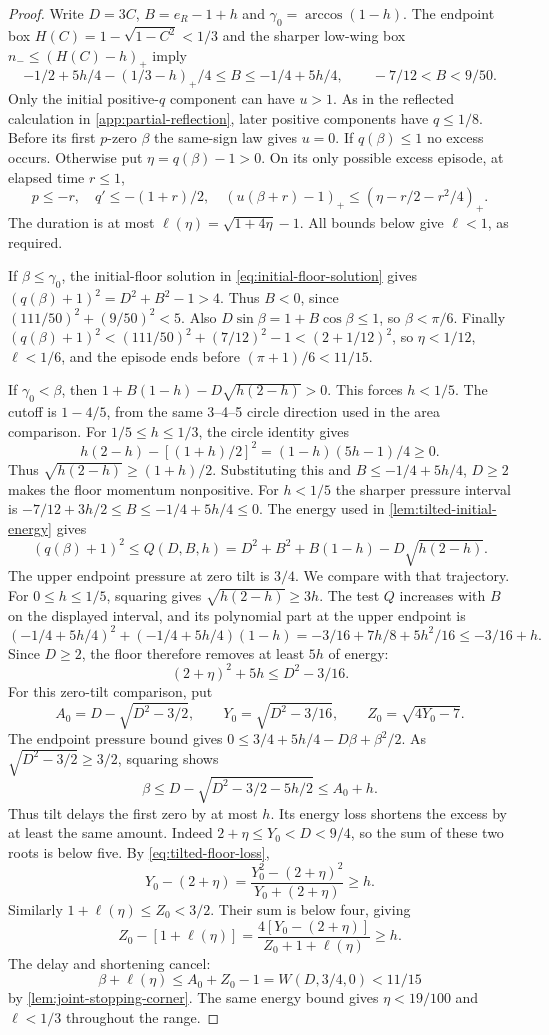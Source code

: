 \begin{proof}
Write $D=3C$, $B=e_R-1+h$ and $\gamma_0=\arccos(1-h)$.
The endpoint box $H(C)=1-\sqrt{1-C^2}<1/3$ and the sharper
low-wing box $n_-\le(H(C)-h)_+$ imply
\[
 -1/2+5h/4-(1/3-h)_+/4\le B\le-1/4+5h/4,
 \qquad -7/12<B<9/50.
\]
Only the initial positive-$q$ component can have $u>1$.
As in the reflected calculation in \cref{app:partial-reflection},
later positive components have $q\le1/8$.
Before its first $p$-zero $\beta$ the same-sign law gives $u=0$.
If $q(\beta)\le1$ no excess occurs. Otherwise put
$\eta=q(\beta)-1>0$.
On its only possible excess episode, at elapsed time $r\le1$,
\[
 p\le-r,\quad q'\le-(1+r)/2,\quad
 (u(\beta+r)-1)_+\le(\eta-r/2-r^2/4)_+.
\]
The duration is at most $\ell(\eta)=\sqrt{1+4\eta}-1$.
All bounds below give $\ell<1$, as required.

If $\beta\le\gamma_0$, the initial-floor solution in
\eqref{eq:initial-floor-solution} gives
$(q(\beta)+1)^2=D^2+B^2-1>4$.
Thus $B<0$, since $(111/50)^2+(9/50)^2<5$.
Also $D\sin\beta=1+B\cos\beta\le1$, so
$\beta<\pi/6$.
Finally $(q(\beta)+1)^2<(111/50)^2+(7/12)^2-1<(2+1/12)^2$,
so $\eta<1/12$, $\ell<1/6$, and the episode ends before
$(\pi+1)/6<11/15$.

If $\gamma_0<\beta$, then
$1+B(1-h)-D\sqrt{h(2-h)}>0$.
This forces $h<1/5$. The cutoff is $1-4/5$, from the same
3--4--5 circle direction used in the area comparison.
For $1/5\le h\le1/3$, the circle identity gives
\[
 h(2-h)-[(1+h)/2]^2=(1-h)(5h-1)/4\ge0.
\]
Thus $\sqrt{h(2-h)}\ge(1+h)/2$. Substituting this and
$B\le-1/4+5h/4$, $D\ge2$ makes the floor momentum nonpositive.
For $h<1/5$ the sharper pressure interval is
$-7/12+3h/2\le B\le-1/4+5h/4\le0$.
The energy used in \cref{lem:tilted-initial-energy} gives
\[
 (q(\beta)+1)^2\le
 Q(D,B,h)=D^2+B^2+B(1-h)-D\sqrt{h(2-h)}.
\]
The upper endpoint pressure at zero tilt is $3/4$. We compare with that trajectory.
For $0\le h\le1/5$, squaring gives $\sqrt{h(2-h)}\ge3h$.
The test $Q$ increases with $B$ on the displayed interval, and its
polynomial part at the upper endpoint is
\[
 (-1/4+5h/4)^2+(-1/4+5h/4)(1-h)
 =-3/16+7h/8+5h^2/16\le-3/16+h.
\]
Since $D\ge2$, the floor therefore removes at least $5h$ of energy:
\begin{equation}\label{eq:tilted-floor-loss}
 (2+\eta)^2+5h\le D^2-3/16.
\end{equation}
For this zero-tilt comparison, put
\[
 A_0=D-\sqrt{D^2-3/2},\qquad
 Y_0=\sqrt{D^2-3/16},\qquad Z_0=\sqrt{4Y_0-7}.
\]
The endpoint pressure bound gives
$0\le3/4+5h/4-D\beta+\beta^2/2$.
As $\sqrt{D^2-3/2}\ge3/2$, squaring shows
\[
 \beta\le D-\sqrt{D^2-3/2-5h/2}\le A_0+h.
\]
Thus tilt delays the first zero by at most $h$.
Its energy loss shortens the excess by at least the same amount.
Indeed $2+\eta\le Y_0<D<9/4$, so the sum of these two roots is below five.
By \eqref{eq:tilted-floor-loss},
\[
 Y_0-(2+\eta)
 =\frac{Y_0^2-(2+\eta)^2}{Y_0+(2+\eta)}\ge h.
\]
Similarly $1+\ell(\eta)\le Z_0<3/2$. Their sum is below four, giving
\[
 Z_0-[1+\ell(\eta)]
 =\frac{4[Y_0-(2+\eta)]}{Z_0+1+\ell(\eta)}\ge h.
\]
The delay and shortening cancel:
\[
 \beta+\ell(\eta)\le A_0+Z_0-1=W(D,3/4,0)<11/15
\]
by \cref{lem:joint-stopping-corner}. The same energy bound gives
$\eta<19/100$ and $\ell<1/3$ throughout the range.


\end{proof}
